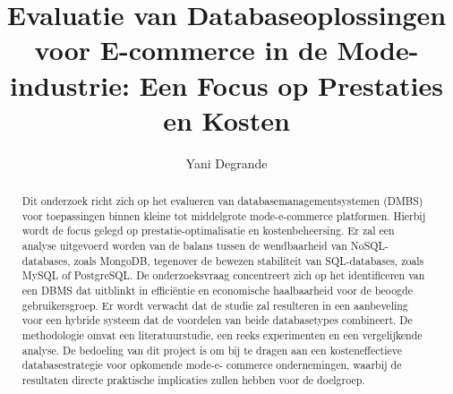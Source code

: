\documentclass{hogent-article}
\title{Evaluatie van Databaseoplossingen voor E-commerce in de Mode-industrie: Een Focus op Prestaties en Kosten}
\author{Yani Degrande}
\begin{document}
\begin{abstract}
    Dit onderzoek richt zich op het evalueren van databasemanagementsystemen (DMBS) voor toepassingen
    binnen kleine tot middelgrote mode-e-commerce platformen. Hierbij wordt de focus gelegd op
    prestatie-optimalisatie en kostenbeheersing. Er zal een analyse uitgevoerd worden van de balans
    tussen de wendbaarheid van NoSQL-databases, zoals MongoDB, tegenover de bewezen stabiliteit
    van SQL-databases, zoals MySQL of PostgreSQL. De onderzoeksvraag concentreert zich op het
    identificeren van een DBMS dat uitblinkt in efficiëntie en economische haalbaarheid voor de
    beoogde gebruikersgroep. Er wordt verwacht dat de studie zal resulteren in een aanbeveling voor
    een hybride systeem dat de voordelen van beide databasetypes combineert. De methodologie omvat
    een literatuurstudie, een reeks experimenten en een vergelijkende analyse. De bedoeling van dit
    project is om bij te dragen aan een kosteneffectieve databasestrategie voor opkomende mode-e-
    commerce ondernemingen, waarbij de resultaten directe praktische implicaties zullen hebben voor
    de doelgroep.
\end{abstract}

\tableofcontents



\printbibliography[heading=bibintoc]
\end{document}
